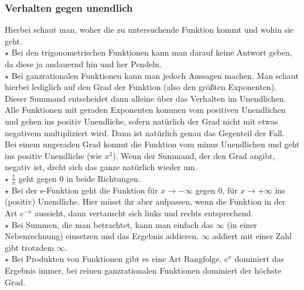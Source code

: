 \subsubsection{Verhalten gegen unendlich}
Hierbei schaut man, woher die zu untersuchende Funktion kommt und wohin sie geht.\\
\(\star\) Bei den trigonometrischen Funktionen kann man darauf keine Antwort geben, da diese ja andauernd hin und her Pendeln.\\
\(\star\) Bei ganzrationalen Funktionen kann man jedoch Aussagen machen. Man schaut hierbei lediglich auf den Grad der Funktion (also den größten Exponenten). Dieser Summand entscheidet dann alleine über das Verhalten im Unendlichen. Alle Funktionen mit geraden Exponenten kommen vom positiven Unendlichen und gehen ins positiv Unendliche, sofern natürlich der Grad nicht mit etwas negativem multipliziert wird. Dann ist natürlich genau das Gegenteil der Fall.\\
Bei einem ungeraden Grad kommt die Funktion vom minus Unendlichen und geht ins positiv Unendliche (wie \(x^3\)). Wenn der Summand, der den Grad angibt, negativ ist, dreht sich das ganze natürlich wieder um.\\
\(\star\) \(\frac{1}{x}\) geht gegen 0 in beide Richtungen.\\
\(\star\) Bei der e-Funktion geht die Funktion für \(x\rightarrow -\infty\) gegen 0, für \(x\rightarrow + \infty\) ins (positiv) Unendliche. Hier müsst ihr aber aufpassen, wenn die Funktion in der Art \(e^{-x}\) aussieht, dann vertauscht sich links und rechts entsprechend.\\
\(\star\) Bei Summen, die man betrachtet, kann man einfach das \(\infty\) (in einer Nebenrechnung) einsetzen und das Ergebnis addieren. \(\infty\) addiert mit einer Zahl gibt trotzdem \(\infty\).\\
\(\star\) Bei Produkten von Funktionen gibt es eine Art Rangfolge. \(e^x\) dominiert das Ergebnis immer, bei reinen ganzrationalen Funktionen dominiert der höchste Grad.

